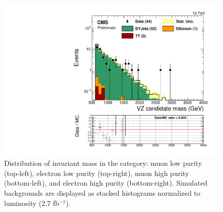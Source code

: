 \begin{figure}[h]
\begin{center}
\includegraphics[scale=0.37]{figures/control/candMassEHP.pdf}
\caption[Distribution of invariant mass]{Distribution of invariant mass in the category: muon low purity (top-left), electron low purity (top-right), muon high purity (bottom-left), and  electron high purity (bottom-right). Simulated backgrounds are displayed as stacked histograms normalized to luminosity (2.7 fb$^{-1}$).}
\label{fig:candMass_VZ}
\end{center}
\end{figure}

%
%
%

